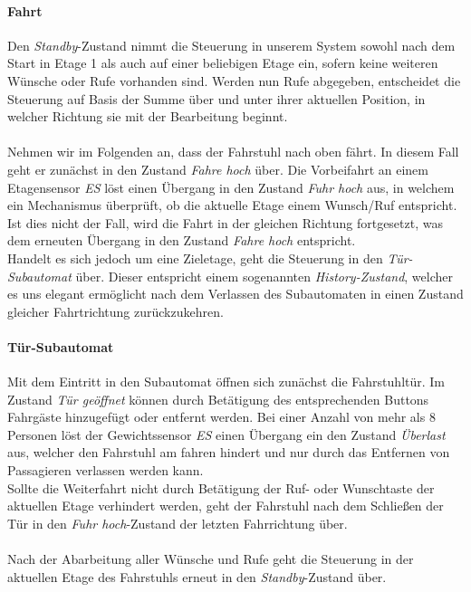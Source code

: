 \paragraph{Fahrt}
Den \textit{Standby}-Zustand nimmt die Steuerung in unserem System sowohl nach dem Start in Etage 1 als auch auf einer beliebigen Etage ein, sofern keine weiteren Wünsche oder Rufe vorhanden sind. Werden nun Rufe abgegeben, entscheidet die Steuerung auf Basis der Summe über und unter ihrer aktuellen Position, in welcher Richtung sie mit der Bearbeitung beginnt.

\paragraph{}Nehmen wir im Folgenden an, dass der Fahrstuhl nach oben fährt. In diesem Fall geht er zunächst in den Zustand \textit{Fahre hoch} über. Die Vorbeifahrt an einem Etagensensor \textit{ES} löst einen Übergang in den Zustand \textit{Fuhr hoch} aus, in welchem ein Mechanismus überprüft, ob die aktuelle Etage einem Wunsch/Ruf entspricht. Ist dies nicht der Fall, wird die Fahrt in der gleichen Richtung fortgesetzt, was dem erneuten Übergang in den Zustand \textit{Fahre hoch} entspricht.\\
Handelt es sich jedoch um eine Zieletage, geht die Steuerung in den \textit{Tür-Subautomat} über. Dieser entspricht einem sogenannten \textit{History-Zustand}\cite{history_Z}, welcher es uns elegant ermöglicht nach dem Verlassen des Subautomaten in einen Zustand gleicher Fahrtrichtung zurückzukehren.

\paragraph{Tür-Subautomat}
Mit dem Eintritt in den Subautomat öffnen sich zunächst die Fahrstuhltür. Im Zustand \textit{Tür geöffnet} können durch Betätigung des entsprechenden Buttons Fahrgäste hinzugefügt oder entfernt werden. Bei einer Anzahl von mehr als 8 Personen löst der Gewichtssensor \textit{ES} einen Übergang ein den Zustand \textit{Überlast} aus, welcher den Fahrstuhl am fahren hindert und nur durch das Entfernen von Passagieren verlassen werden kann.\\
Sollte die Weiterfahrt nicht durch Betätigung der Ruf- oder Wunschtaste der aktuellen Etage verhindert werden, geht der Fahrstuhl nach dem Schließen der Tür in den \textit{Fuhr hoch}-Zustand der letzten Fahrrichtung über.

\paragraph{}Nach der Abarbeitung aller Wünsche und Rufe geht die Steuerung in der aktuellen Etage des Fahrstuhls erneut in den \textit{Standby}-Zustand über.

